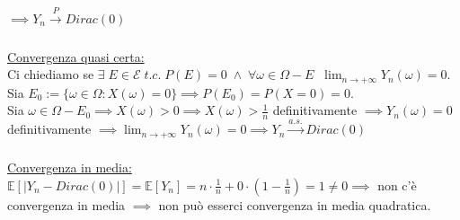\documentclass{article}
\begin{document}
$ \implies Y_{n} \xrightarrow[]{P} Dirac(0)$\\
\\
\underline{Convergenza quasi certa:}\\
Ci chiediamo se $\exists \; E \in \mathcal{E} \; t.c. \; P(E)=0 \; \wedge \; \forall \omega \in \Omega - E \; \; \lim_{n\to +\infty}Y_{n}(\omega) = 0$.\\
Sia $E_{0} := \{\omega \in \Omega: X(\omega)=0 \} \implies P(E_{0}) = P(X=0) = 0$.\\
Sia $\omega \in \Omega - E_{0} \implies X(\omega) > 0 \implies X(\omega) > \frac{1}{n}$ definitivamente $\implies Y_{n}(\omega) = 0$ definitivamente $\implies \lim_{n\to +\infty}Y_{n}(\omega) = 0 \implies Y_{n} \xrightarrow[]{a.s.} Dirac(0)$\\
\\
\underline{Convergenza in media:}\\
$\mathbb{E}[|Y_{n}-Dirac(0)|] = \mathbb{E}[Y_{n}] = n\cdot \frac{1}{n} + 0\cdot (1-\frac{1}{n}) = 1 \neq 0 \implies$ non c'è convergenza in media $\implies$ non può esserci convergenza in media quadratica.
\end{document}
